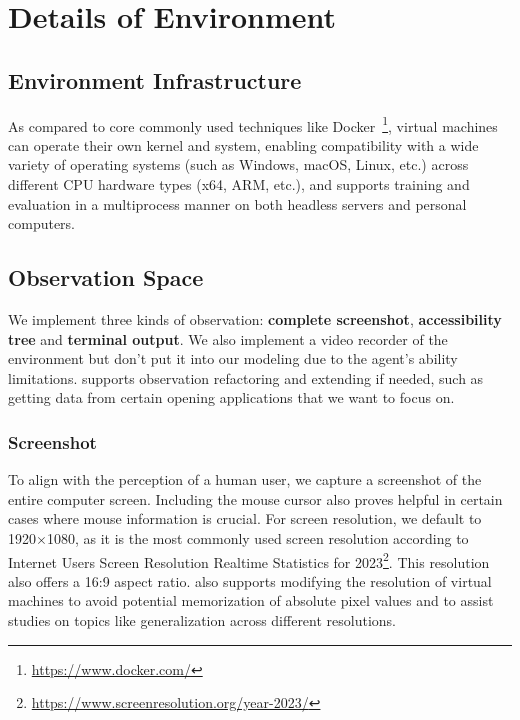 
\section{Details of \ours Environment}

\subsection{Environment Infrastructure}
\label{app:env_infra}
As compared to core commonly used techniques like Docker~\footnote{\url{https://www.docker.com/}}, virtual machines can operate their own kernel and system, enabling compatibility with a wide variety of operating systems (such as Windows, macOS, Linux, etc.) across different CPU hardware types (x64, ARM, etc.), and supports training and evaluation in a multiprocess manner on both headless servers and personal computers.

\subsection{Observation Space}
\label{app:observation_space}
We implement three kinds of observation: 
\textbf{complete screenshot}, \textbf{accessibility tree} and \textbf{terminal output}.
We also implement a video recorder of the environment but don't put it into our modeling due to the agent's ability limitations.
\ours supports observation refactoring and extending if needed, such as getting data from certain opening applications that we want to focus on.

\subsubsection{Screenshot}
To align with the perception of a human user, we capture a screenshot of the entire computer screen. 
Including the mouse cursor also proves helpful in certain cases where mouse information is crucial. 
For screen resolution, we default to 1920$\times$1080, as it is the most commonly used screen resolution according to Internet Users Screen Resolution Realtime Statistics for 2023\footnote{\url{https://www.screenresolution.org/year-2023/}}. 
This resolution also offers a 16:9 aspect ratio. 
\ours also supports modifying the resolution of virtual machines to avoid potential memorization of absolute pixel values and to assist studies on topics like generalization across different resolutions.

